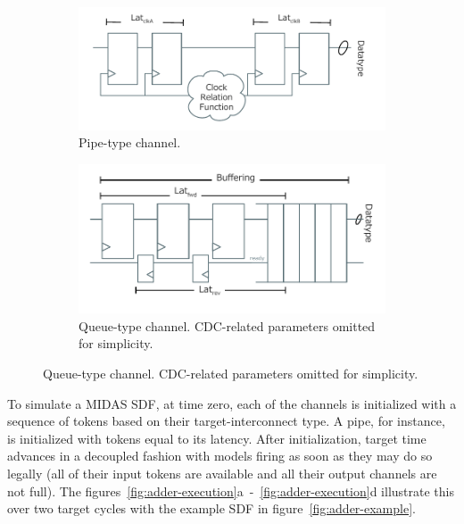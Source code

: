 \begin{figure}
    \centering
    \begin{subfigure}[t]{0.48\textwidth}
        \includegraphics[width=\textwidth]{figures/pipe.pdf}
        \caption{Pipe-type channel.}
        \label{fig:pipe}
    \end{subfigure}\hspace{0.5cm}
    \begin{subfigure}[t]{0.48\textwidth}
        \includegraphics[width=\textwidth]{figures/queue.pdf}
        \caption{Queue-type channel. CDC-related parameters omitted for simplicity.}
        \label{fig:queue}
    \end{subfigure}
\end{figure}

To simulate a MIDAS SDF, at time zero, each of the channels is initialized with a sequence of tokens
based on their target-interconnect type. A pipe, for instance, is
initialized with tokens equal to its latency. After initialization, target time
advances in a decoupled fashion with models firing as soon as they may do so legally
(all of their input tokens are available and all their output channels are not
full). The figures~\ref{fig:adder-execution}a~-~\ref{fig:adder-execution}d
illustrate this over two target cycles with the example SDF in figure~\ref{fig:adder-example}.

